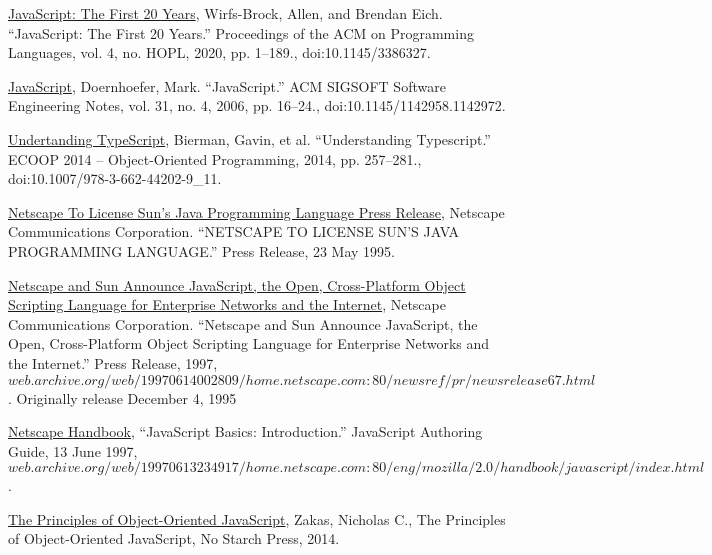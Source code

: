 \documentclass{article}
\theoremstyle{theorem}
\theoremstyle{definition}
\theoremstyle{remark}
\begin{document}
\begin{thebibliography}{99}


\href{https://dl.acm.org/doi/pdf/10.1145/3386327}{JavaScript: The First 20 Years}, Wirfs-Brock, Allen, and Brendan Eich. “JavaScript: The First 20 Years.” Proceedings of the ACM on Programming Languages, vol. 4, no. HOPL, 2020, pp. 1–189., doi:10.1145/3386327.

\href{https://dl.acm.org/doi/pdf/10.1145/1142958.1142972}{JavaScript}, Doernhoefer, Mark. “JavaScript.” ACM SIGSOFT Software Engineering Notes, vol. 31, no. 4, 2006, pp. 16–24., doi:10.1145/1142958.1142972.

\href{https://link.springer.com/chapter/10.1007/978-3-662-44202-9_11#citeas}{Undertanding TypeScript}, Bierman, Gavin, et al. “Understanding Typescript.” ECOOP 2014 – Object-Oriented Programming, 2014, pp. 257–281., doi:10.1007/978-3-662-44202-9\_11.

\href{https://web.archive.org/web/19970614003224/http://home.netscape.com/newsref/pr/newsrelease25.html}{Netscape To License Sun's Java Programming Language Press Release}, Netscape Communications Corporation. “NETSCAPE TO LICENSE SUN'S JAVA PROGRAMMING LANGUAGE.” Press Release, 23 May 1995.

\href{https://web.archive.org/web/19970614002809/http://home.netscape.com:80/newsref/pr/newsrelease67.html}{Netscape and Sun Announce JavaScript, the Open, Cross-Platform Object Scripting Language for Enterprise Networks and the Internet}, Netscape Communications Corporation. “Netscape and Sun Announce JavaScript, the Open, Cross-Platform Object Scripting Language for Enterprise Networks and the Internet.” Press Release, 1997, $web.archive.org/web/19970614002809/home.netscape.com:80/newsref/pr/newsrelease67.html$. Originally release December 4, 1995

\href{https://web.archive.org/web/19970613234917/http://home.netscape.com:80/eng/mozilla/2.0/handbook/javascript/index.html}{Netscape Handbook}, “JavaScript Basics: Introduction.” JavaScript Authoring Guide, 13 June 1997, $web.archive.org/web/19970613234917/home.netscape.com:80/eng/mozilla/2.0/handbook/javascript/index.html$.

\href{https://books.google.com/books?hl=en&lr=&id=dAYvDwAAQBAJ&oi=fnd&pg=PR5&dq=object-oriented+languages+JavaScript+&ots=4l9H4SZpBY&sig=BL5PctDpcVNpNCQ21q4k8k_TkWA#v=onepage&q=object-oriented%20languages%20JavaScript&f=false}{The Principles of Object-Oriented JavaScript}, Zakas, Nicholas C., The Principles of Object-Oriented JavaScript, No Starch Press, 2014.


\end{thebibliography}
\end{document}
